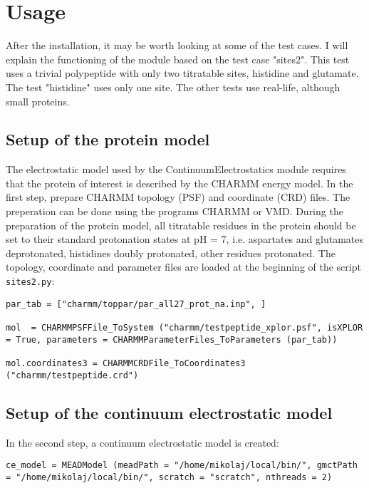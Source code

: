 \documentclass[a4paper,11pt]{article}
\newcommand{\modulename}{ContinuumElectrostatics\xspace}
\begin{document}
\section{Usage}
After the installation, it may be worth looking at some of the test cases.
%
I will explain the functioning of the module based on the test case "sites2".
%
This test uses a trivial polypeptide with only two titratable sites,
histidine and glutamate.
%
The test "histidine" uses only one site. The other tests use real-life,
although small proteins.


\subsection{Setup of the protein model}
The electrostatic model used by the \modulename module requires that the protein
of interest is described by the CHARMM energy model.
%
In the first step, prepare CHARMM topology (PSF) and coordinate (CRD) files.
%
The preperation can be done using the programs CHARMM or VMD.
%
During the preparation of the protein model, all titratable residues in the protein
should be set to their standard protonation states at pH = 7, i.e. aspartates
and glutamates deprotonated, histidines doubly protonated, other residues
protonated.
%
The topology, coordinate and parameter files are loaded at the
beginning of the script \texttt{sites2.py}:

{\footnotesize \begin{lstlisting}
par_tab = ["charmm/toppar/par_all27_prot_na.inp", ]

mol  = CHARMMPSFFile_ToSystem ("charmm/testpeptide_xplor.psf", isXPLOR = True, parameters = CHARMMParameterFiles_ToParameters (par_tab))

mol.coordinates3 = CHARMMCRDFile_ToCoordinates3 ("charmm/testpeptide.crd")
\end{lstlisting} }


\subsection{Setup of the continuum electrostatic model}
In the second step, a continuum electrostatic model is created:

{\footnotesize \begin{lstlisting}
ce_model = MEADModel (meadPath = "/home/mikolaj/local/bin/", gmctPath = "/home/mikolaj/local/bin/", scratch = "scratch", nthreads = 2)
\end{lstlisting} }
\end{document}
